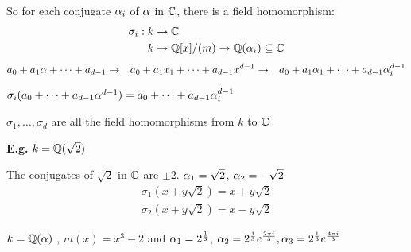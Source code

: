 \documentclass[11pt]{article}
\begin{document}
So for each conjugate $\alpha_i$ of $\alpha $ in $\mathbb{C}$, there is a field homomorphism:
\begin{align*}
	\sigma_i : k &\to \mathbb{C}\\
	 k &\to \mathbb{Q}[x]/(m) \to \mathbb{Q}(\alpha_i) \subseteq \mathbb{C}\\
\end{align*}
\vspace{-3em}
\begin{align*}
	a_0 +a_1\alpha + \dots + a_{d-1} &\to& a_0+a_1x_1+\dots+a_{d-1}x^{d-1} &\to& a_0+a_1\alpha_1 + \dots + a_{d-1}\alpha_i^{d-1} 
\end{align*}


$ \sigma_i (a_0 + \dots + a_{d-1} \alpha^{d-1}) = a_0 +\dots + a_{d-1}\alpha_i^{d-1}$
\begin{prop}
$\sigma_1, \dots, \sigma_d$ are all the field homomorphisms from $k $ to $\mathbb{C}$
\end{prop}
$ $\\[-0.5em]
\textbf{E.g.} $k = \mathbb{Q}(\sqrt{2})$

The conjugates of $\sqrt{2}$ in $\mathbb{C}$ are $\pm 2$. 
$\alpha_1 = \sqrt{2}$,
$\alpha_2 = -\sqrt{2}$
\begin{align*}
	\sigma_1(x+y\sqrt{2}) = x +y\sqrt{2} \\
	\sigma_2(x+y\sqrt{2}) = x - y\sqrt{2}
\end{align*}

$k = \mathbb{Q}(\alpha)$ , $m(x) = x^3 - 2$ and $\alpha_1 = 2^{\frac{1}{3}}$, $\alpha_2 = 2^{\frac{1}{3}}e^{\frac{2\pi i}{3}} ,\alpha_3 = 2^{\frac{1}{3}} e^{\frac{4\pi i }{3}}$
\end{document}
